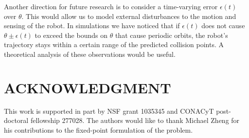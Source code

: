 \documentclass[letterpaper, 10 pt, conference]{ieeeconf}  %
\begin{document}
Another direction for future research is to consider a 
time-varying error $\epsilon(t)$ over $\theta$. This would
allow us to model external disturbances to the 
motion and sensing of the robot. In
simulations we have noticed that if $\epsilon(t)$ does not cause $\theta \pm
\epsilon(t)$ to exceed the bounds on $\theta$ that cause periodic orbits, the robot's 
trajectory stays within a certain range of the predicted collision points. 
A theoretical analysis of these observations would be useful. 

\addtolength{\textheight}{-12cm}   %








\section*{ACKNOWLEDGMENT}

This work is supported in part by NSF grant 1035345 and CONACyT post-doctoral
fellowship 277028. The authors would like to thank Michael Zheng for his
contributions to the fixed-point formulation of the problem.




\end{document}
